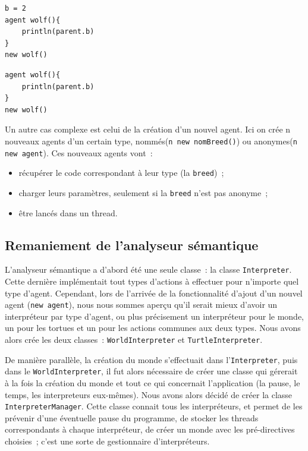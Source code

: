 \begin{lstlisting}[label=affect-parent,caption=Affectation d'une variable héritée]
b = 2
agent wolf(){
	println(parent.b)
}
new wolf()
\end{lstlisting}
\begin{lstlisting}[label=non-affect-parent,caption=Erreur d'affectation d'une variable héritée]
agent wolf(){
	println(parent.b)
}
new wolf()
\end{lstlisting}

Un autre cas complexe est celui de la création d'un nouvel agent. Ici on crée n nouveaux agents d'un certain type, nommés(\verb|n new nomBreed()|) ou anonymes(\verb|n new agent|). Ces nouveaux agents vont~:
\begin{itemize}
\item récupérer le code correspondant à leur type (la \verb|breed|)~;
\item charger leurs paramètres, seulement si la \verb|breed| n'est pas anonyme~;
\item être lancés dans un thread.
\end{itemize}


\subsection{Remaniement de l'analyseur sémantique}
\label{remaniementInterpreter}

L'analyseur sémantique a d'abord été une seule classe~: la classe \verb|Interpreter|.
Cette dernière implémentait tout types d'actions à effectuer pour n'importe quel type d'agent.
Cependant, lors de l'arrivée de la fonctionnalité d'ajout d'un nouvel agent (\verb|new agent|), nous nous sommes aperçu qu'il serait mieux d'avoir un interpréteur par type d'agent, ou plus précisement un interpréteur pour le monde, un pour les tortues et un pour les actions communes aux deux types.
Nous avons alors crée les deux classes~: \verb|WorldInterpreter| et \verb|TurtleInterpreter|.

De manière parallèle, la création du monde s'effectuait dans l'\verb|Interpreter|, puis dans le \verb|WorldInterpreter|, il fut alors nécessaire de créer une classe qui gérerait à la fois la création du monde et tout ce qui concernait l'application (la pause, le temps, les interpreteurs eux-mêmes). Nous avons alors décidé de créer la classe \verb|InterpreterManager|.
Cette classe connait tous les interpréteurs, et permet de les prévenir d'une éventuelle pause du programme, de stocker les threads correspondants à chaque interpréteur, de créer un monde avec les pré-directives choisies~; c'est une sorte de gestionnaire d'interpréteurs.
